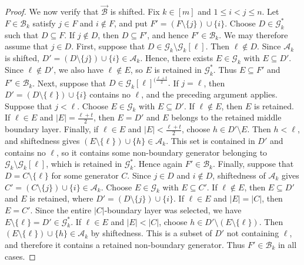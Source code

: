 \documentclass[11pt,a4paper]{article}
\begin{document}
\begin{proof}
We now verify that $\vec{\mathcal B}$ is shifted. Fix $k\in[m]$
and $1\leq i<j\leq n$. Let $F\in\mathcal B_k$ satisfy
$j\in F$ and $i\notin F$, and put
$
  F'=(F\setminus\{j\})\cup\{i\}.
$
Choose $D\in\mathcal G_k^{*}$ such that $D\subseteq F$. If
$j\notin D$, then $D\subseteq F'$, and hence $F'\in\mathcal B_k$.
We may therefore assume that $j\in D$.
First, suppose that
$
  D\in\mathcal G_k\setminus\mathcal G_k[\ell].
$
Then $\ell\notin D$. Since $\mathcal A_k$ is shifted,
$
  D'=(D\setminus\{j\})\cup\{i\}\in\mathcal A_k.
$
Hence, there exists $E\in\mathcal G_k$ with $E\subseteq D'$. Since
$\ell\notin D'$, we also have $\ell\notin E$, so $E$ is retained in
$\mathcal G_k^{*}$. Thus $E\subseteq F'$ and
$F'\in\mathcal B_k$.
Next, suppose that
$
  D\in\mathcal G_k[\ell]^{(\frac{\ell+t}{2}}.
$
If $j=\ell$, then $D'=(D\setminus\{\ell\})\cup\{i\}$ contains no
$\ell$, and the preceding argument applies. Suppose that $j<\ell$.
Choose $E\in\mathcal G_k$ with $E\subseteq D'$. If $\ell\notin E$,
then $E$ is retained. If $\ell\in E$ and
$|E|=\frac{\ell+t}{2}$, then $E=D'$ and $E$ belongs to the retained middle
boundary layer. Finally, if $\ell\in E$ and
$|E|<\frac{\ell+t}{2}$, choose
$
  h\in D'\setminus E.
$
Then $h<\ell$, and shiftedness gives
$
  (E\setminus\{\ell\})\cup\{h\}\in\mathcal A_k.
$
This set is contained in $D'$ and contains no $\ell$, so it contains
some non-boundary generator belonging to
$\mathcal G_k\setminus\mathcal G_k[\ell]$, which is retained in
$\mathcal G_k^{*}$. Hence again $F'\in\mathcal B_k$.
Finally, suppose that
$
  D=C\setminus\{\ell\}
$
for some generator $C$. Since
$j\in D$ and $i\notin D$, shiftedness of $\mathcal A_k$ gives
$
  C'=(C\setminus\{j\})\cup\{i\}\in\mathcal A_k.
$
Choose $E\in\mathcal G_k$ with $E\subseteq C'$. If $\ell\notin E$,
then $E\subseteq D'$ and $E$ is retained, where
$
  D'=(D\setminus\{j\})\cup\{i\}.
$
If $\ell\in E$ and $|E|=|C|$, then $E=C'$. Since the entire
$|C|$-boundary layer was selected, we have
$
  E\setminus\{\ell\}=D'\in\mathcal G_k^{*}.
$
If $\ell\in E$ and $|E|<|C|$, choose
$
  h\in D'\setminus(E\setminus\{\ell\}).
$
Then
$
  (E\setminus\{\ell\})\cup\{h\}\in\mathcal A_k
$
by shiftedness. This is a subset of $D'$ not containing $\ell$, and
therefore it contains a retained non-boundary generator. Thus
$F'\in\mathcal B_k$ in all cases.


\end{proof}
\end{document}
